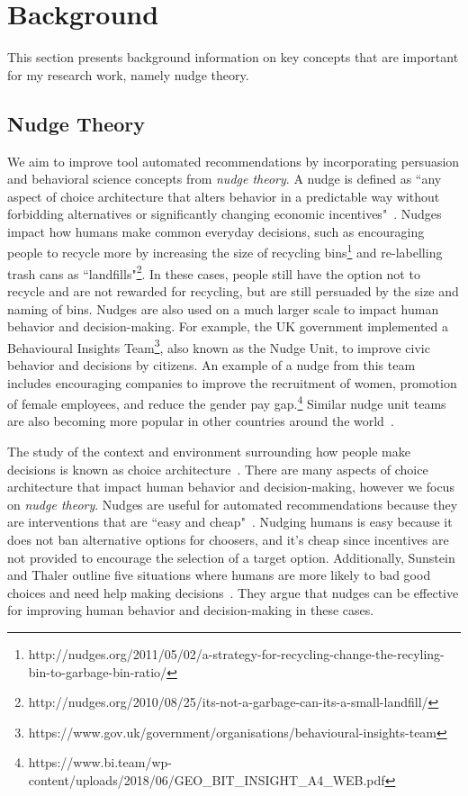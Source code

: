 \section{Background}

This section presents background information on key concepts that are important for my research work, namely nudge theory.

\subsection{Nudge Theory}

We aim to improve tool automated recommendations by incorporating persuasion and behavioral science concepts from \textit{nudge theory}. A nudge is defined as ``any aspect of choice architecture that alters behavior in a predictable way without forbidding alternatives or significantly changing economic incentives"~\cite[p.~6]{sunstein2008nudge}. Nudges impact how humans make common everyday decisions, such as encouraging people to recycle more by increasing the size of recycling bins\footnote{http://nudges.org/2011/05/02/a-strategy-for-recycling-change-the-recyling-bin-to-garbage-bin-ratio/} and re-labelling trash cans as ``landfills"\footnote{http://nudges.org/2010/08/25/its-not-a-garbage-can-its-a-small-landfill/}. In these cases, people still have the option not to recycle and are not rewarded for recycling, but are still persuaded by the size and naming of bins. Nudges are also used on a much larger scale to impact human behavior and decision-making. For example, the UK government implemented a Behavioural Insights Team\footnote{https://www.gov.uk/government/organisations/behavioural-insights-team}, also known as the Nudge Unit, to improve civic behavior and decisions by citizens. An example of a nudge from this team includes encouraging companies to improve the recruitment of women, promotion of female employees, and reduce the gender pay gap.\footnote{https://www.bi.team/wp-content/uploads/2018/06/GEO_BIT_INSIGHT_A4_WEB.pdf} Similar nudge unit teams are also becoming more popular in other countries around the world~\cite{DelBalzoNudging}.

The study of the context and environment surrounding how people make decisions is known as choice architecture~\cite{thaler2014choice}. There are many aspects of choice architecture that impact human behavior and decision-making, however we focus on \textit{nudge theory}. Nudges are useful for automated recommendations because they are interventions that are ``easy and cheap"~\cite[p.~6]{sunstein2008nudge}. Nudging humans is easy because it does not ban alternative options for choosers, and it's cheap since incentives are not provided to encourage the selection of a target option. Additionally, Sunstein and Thaler outline five situations where humans are more likely to bad good choices and need help making decisions~\cite[p.~74-82]{sunstein2008nudge}. They argue that nudges can be effective for improving human behavior and decision-making in these cases. %

